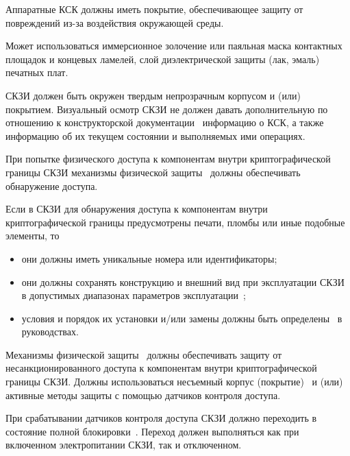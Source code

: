 \label{R.PS.Passivation} %
Аппаратные КСК должны иметь покрытие, обеспечивающее защиту от 
повреждений из-за воздействия окружающей среды. 

\begin{note*}
Может использоваться иммерсионное золочение или паяльная маска 
контактных площадок и концевых ламелей, слой диэлектрической защиты 
(лак, эмаль) печатных плат.
\end{note*}


\label{R.PS.Coating} %
СКЗИ должен быть окружен твердым непрозрачным корпусом и (или) покрытием.
%
Визуальный осмотр СКЗИ не должен давать дополнительную по отношению 
к конструкторской документации~ информацию 
о КСК, а также информацию об их текущем состоянии и выполняемых ими  
операциях.


\label{R.PS.PassiveDetection} %
При попытке физического доступа к компонентам внутри 
криптографической границы СКЗИ механизмы физической защиты~ 
должны обеспечивать обнаружение доступа. 

\label{R.PS.PassiveDetectionId} %
Если в СКЗИ для обнаружения доступа к компонентам внутри 
криптографической границы предусмотрены печати, пломбы или иные подобные 
элементы, то 
\begin{itemize}
\item
они должны иметь уникальные номера или идентификаторы;
\item
они должны сохранять конструкцию и внешний вид при эксплуатации СКЗИ в допустимых 
диапазонах параметров эксплуатации~;
\item
условия и порядок их установки и/или замены
должны быть определены~ в руководствах.
\end{itemize}


\label{R.PS.ActiveDetectionSensor} %
Механизмы физической защиты~ должны обеспечивать 
защиту от несанкционированного доступа к компонентам внутри 
криптографической границы СКЗИ. 
%
Должны использоваться несъемный корпус (покрытие)~ 
и (или) активные методы защиты с помощью датчиков контроля доступа.

\label{R.PS.Erasing} %
При срабатывании датчиков контроля доступа СКЗИ должно 
переходить в состояние полной блокировки~.
%
Переход должен выполняться как при включенном электропитании 
СКЗИ, так и отключенном.

